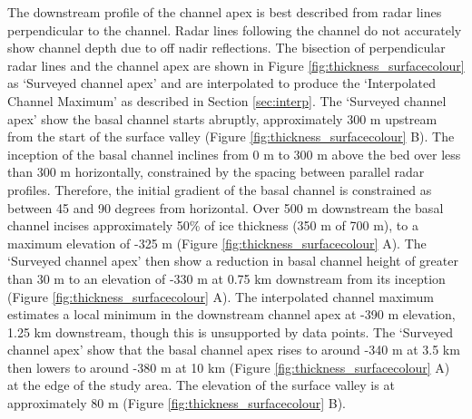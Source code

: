 The downstream profile of the channel apex is best described from radar lines perpendicular to the channel. Radar lines following the channel do not accurately show channel depth due to off nadir reflections.  The bisection of perpendicular radar lines and the channel apex are shown in Figure \ref{fig:thickness_surfacecolour} as `Surveyed channel apex' and are interpolated to produce the `Interpolated Channel Maximum' as described in Section \ref{sec:interp}.  The `Surveyed channel apex' show the basal channel starts abruptly, approximately 300 m upstream from the start of the surface valley (Figure \ref{fig:thickness_surfacecolour} B). The inception of the basal channel inclines from 0 m to 300 m above the bed over less than 300 m horizontally, constrained by the spacing between parallel radar profiles. Therefore, the initial gradient of the basal channel is constrained as between 45 and 90 degrees from horizontal. Over 500 m downstream the basal channel incises approximately 50\% of ice thickness (350 m of 700 m), to a maximum elevation of -325 m (Figure \ref{fig:thickness_surfacecolour} A).
The `Surveyed channel apex' then show a reduction in basal channel height of greater than 30 m to an elevation of -330 m at 0.75 km downstream from its inception (Figure \ref{fig:thickness_surfacecolour} A). The interpolated channel maximum estimates a local minimum in the downstream channel apex at -390 m elevation, 1.25 km downstream, though this is unsupported by data points.  The `Surveyed channel apex' show that the basal channel apex rises to around -340 m at 3.5 km then lowers to around -380 m at 10 km (Figure \ref{fig:thickness_surfacecolour} A) at the edge of the study area. The elevation of the surface valley is at approximately 80 m (Figure \ref{fig:thickness_surfacecolour} B). 

